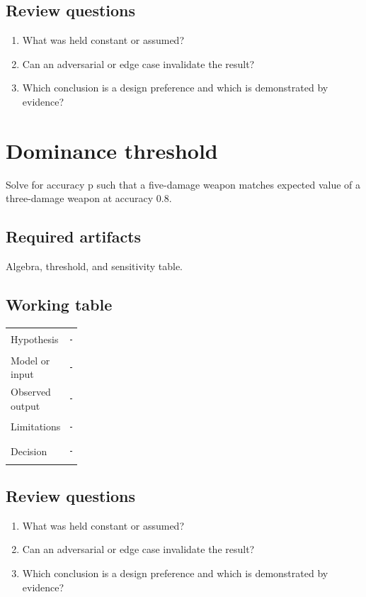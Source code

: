 \documentclass[11pt]{article}
\begin{document}
\subsection{Review questions}
\begin{enumerate}
\item What was held constant or assumed?
\item Can an adversarial or edge case invalidate the result?
\item Which conclusion is a design preference and which is demonstrated by evidence?
\end{enumerate}

\section{Dominance threshold}
Solve for accuracy p such that a five-damage weapon matches expected value of a three-damage weapon at accuracy 0.8.


\subsection{Required artifacts}
Algebra, threshold, and sensitivity table.


\subsection{Working table}
\begin{tabularx}{\linewidth}{@{}p{0.20\linewidth}X@{}}\toprule
Hypothesis & \rule{0.90\linewidth}{0.4pt}\\[0.35cm]
Model or input & \rule{0.90\linewidth}{0.4pt}\\[0.35cm]
Observed output & \rule{0.90\linewidth}{0.4pt}\\[0.35cm]
Limitations & \rule{0.90\linewidth}{0.4pt}\\[0.35cm]
Decision & \rule{0.90\linewidth}{0.4pt}\\\bottomrule\end{tabularx}

\subsection{Review questions}
\begin{enumerate}
\item What was held constant or assumed?
\item Can an adversarial or edge case invalidate the result?
\item Which conclusion is a design preference and which is demonstrated by evidence?
\end{enumerate}
\end{document}
